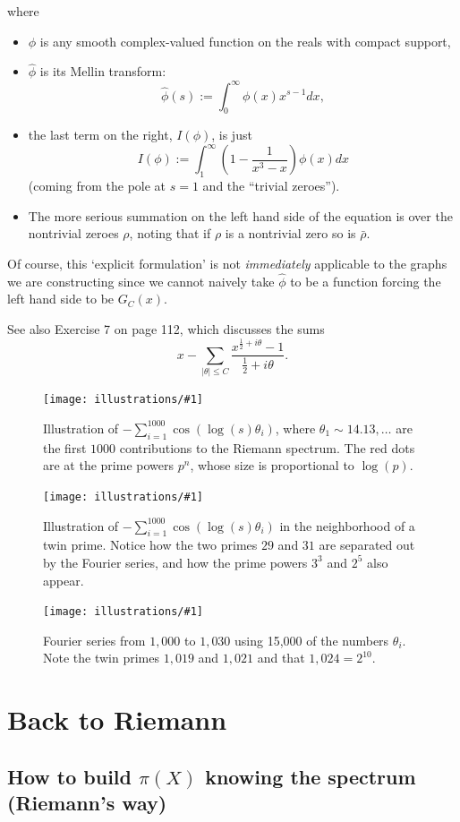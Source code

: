 \documentclass[openany]{book}
\newcommand{\ill}[3]{%
   \begin{figure}[H]%
   \vspace{-2ex}
   \centering%
   \texttt{[image: illustrations/\#1]}%
   \caption{#3}%
   \vspace{-2ex}
    \end{figure}}
\theoremstyle{plain}
\theoremstyle{definition}
\begin{document}
{{{where \begin{itemize} \item $\phi$ is any smooth complex-valued
  function on the reals with compact support,\item ${\hat \phi}$ is
  its Mellin transform: $${\hat \phi}(s):=
  \int_0^{\infty}\phi(x)x^{s-1}dx,$$ \item the last term on the right,
  $I(\phi)$, is just
 $$I(\phi):= \int_1^{\infty}(1-{\frac{1}{x^3-x}})\phi(x)dx$$ (coming from the pole at $s=1$ and the ``trivial zeroes''). \item The more serious  summation on the left hand side of the equation is over the nontrivial zeroes $\rho$, noting that if $\rho$ is a nontrivial zero so is ${\bar \rho}$. \end{itemize}



Of course, this `explicit formulation' is not {\it immediately}
applicable to the graphs we are constructing since we cannot naively
take ${\hat \phi}$ to be a function forcing the left hand side to be
$G_C(x)$.

   See also Exercise 7 on page 112,  which discusses the sums $$x - \sum_{|\theta| \le C} {\frac{x^{{\frac{1}{2}} +i\theta}-1}{{\frac{1}{2}} +i\theta}}.$$}


 \ill{phi_cos_sum_2_30_1000}{.8}{Illustration of $-\sum_{i=1}^{1000}
   \cos(\log(s)\theta_i)$, where $\theta_1 \sim 14.13, \ldots$ are the
   first $1000$ contributions to the Riemann spectrum.  The red dots
   are at the prime powers $p^n$, whose size is proportional to
   $\log(p)$.}

 \ill{phi_cos_sum_26_34_1000}{.8}{Illustration of $-\sum_{i=1}^{1000}
   \cos(\log(s)\theta_i)$ in the neighborhood of a twin prime.  Notice
   how the two primes $29$ and $31$ are separated out by the Fourier
   series, and how the prime powers $3^3$ and $2^5$ also appear.}

 \ill{phi_cos_sum_1010_1026_15000}{.7}{Fourier series from $1,000$ to
   $1,030$ using 15,000 of the numbers $\theta_i$.  Note the twin
   primes $1{,}019$ and $1{,}021$ and that $1{,}024=2^{10}$.}


\part{Back to Riemann\label{part4}}


\chapter[Building $\pi(X)$ knowing the spectrum]{How to build $\pi(X)$ knowing the spectrum (Riemann's way)}


}}
\end{document}
